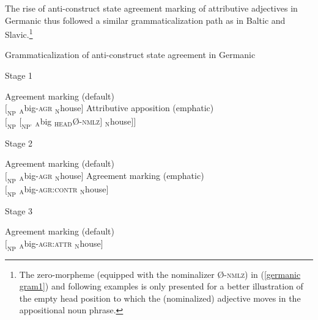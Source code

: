 {The rise of anti\hyp{}construct state agreement marking of attributive adjectives in Germanic thus followed a similar grammaticalization path as in Baltic and Slavic.\footnote{The zero-morpheme (equipped with the nominalizer Ø-\textsc{nmlz}) in (\ref{germanic gram1}) and following examples is only presented for a better illustration of the empty head position to which the (nominalized) adjective moves in the appositional noun phrase.}
\begin{exe}
\ex \label{germanic gram1} 
	\rm{Grammaticalization of anti\hyp{}construct state agreement in Germanic}
\begin{xlist}
\ex \label{germanic1}
	\rm{Stage 1}
\begin{xlist}
\ex	\rm{Agreement marking (default)}\\
$[_{\text{NP}}$ $_{\text{A}}$big-\textsc{agr} $_{\text{N}}$house$]$
\ex	\rm{Attributive apposition (emphatic)}\\
$[_{\text{NP}}$ $[_{\text{NP'}}$ $_{\text{A}}$big $_{\text{HEAD}}$Ø-\textsc{nmlz}$]$ $_{\text{N}}$house$] ]$\label{germanic art1}
\end{xlist}
\ex \label{germanic2}
	\rm{Stage 2} 
\begin{xlist}
\ex	\rm{Agreement marking (default)}\\
$[_{\text{NP}}$ $_{\text{A}}$big-\textsc{agr} $_{\text{N}}$house$]$
\ex	\rm{Agreement marking (emphatic)}\\
$[_{\text{NP}}$ $_{\text{A}}$big-\textsc{agr:contr} $_{\text{N}}$house$]$\label{germanic ACAgr}
\end{xlist}
\ex \label{germanic3}
	\rm{Stage 3}
\begin{xlist}
\ex 	\rm{Agreement marking (default)}\\
$[_{\text{NP}}$ $_{\text{A}}$big-\textsc{agr:attr} $_{\text{N}}$house$]$
\end{xlist}
\end{xlist}
\end{exe}
}
